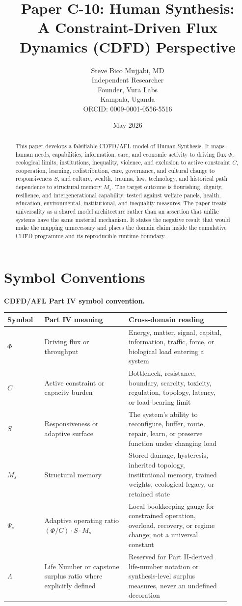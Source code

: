 \documentclass[11pt,a4paper]{article}
\title{\textbf{Paper C-10: Human Synthesis:\\ A Constraint-Driven Flux Dynamics (CDFD) Perspective}}
\author{Steve Bico Mujjabi, MD\\
\small Independent Researcher\\
\small Founder, Vura Labs\\
\small Kampala, Uganda\\
\small ORCID: 0009-0001-0556-5516}
\date{May 2026}
\begin{document}
\maketitle


\begin{abstract}
This paper develops a falsifiable CDFD/AFL model of Human Synthesis. It maps human needs, capabilities, information, care, and economic activity to driving flux $\Phi$, ecological limits, institutions, inequality, violence, and exclusion to active constraint $C$, cooperation, learning, redistribution, care, governance, and cultural change to responsiveness $S$, and culture, wealth, trauma, law, technology, and historical path dependence to structural memory $M_s$. The target outcome is flourishing, dignity, resilience, and intergenerational capability, tested against welfare panels, health, education, environmental, institutional, and inequality measures. The paper treats universality as a shared model architecture rather than an assertion that unlike systems have the same material mechanism. It states the negative result that would make the mapping unnecessary and places the domain claim inside the cumulative CDFD programme and its reproducible runtime boundary.
\end{abstract}

\section*{Symbol Conventions}

\noindent\textbf{CDFD/AFL Part IV symbol convention.}
\begin{center}
{\small
\begin{tabular}{p{0.15\linewidth}p{0.34\linewidth}p{0.41\linewidth}}
\hline
Symbol & Part IV meaning & Cross-domain reading \\
\hline
$\Phi$ & Driving flux or throughput & Energy, matter, signal, capital, information, traffic, force, or biological load entering a system \\
$C$ & Active constraint or capacity burden & Bottleneck, resistance, boundary, scarcity, toxicity, regulation, topology, latency, or load-bearing limit \\
$S$ & Responsiveness or adaptive surface & The system's ability to reconfigure, buffer, route, repair, learn, or preserve function under changing load \\
$M_s$ & Structural memory & Stored damage, hysteresis, inherited topology, institutional memory, trained weights, ecological legacy, or retained state \\
$\Psi_s$ & Adaptive operating ratio $(\Phi/C)\cdot S\cdot M_s$ & Local bookkeeping gauge for constrained operation, overload, recovery, or regime change; not a universal constant \\
$\Lambda$ & Life Number or capstone surplus ratio where explicitly defined & Reserved for Part II-derived life-number notation or synthesis-level surplus measures, never an undefined decoration \\
\hline
\end{tabular}
}
\end{center}
\end{document}
